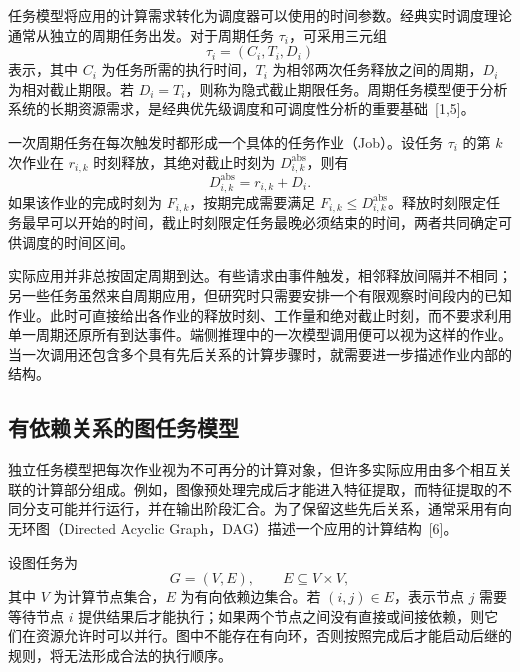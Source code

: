 任务模型将应用的计算需求转化为调度器可以使用的时间参数。经典实时调度理论通常从独立的周期任务出发。对于周期任务 $\tau_i$，可采用三元组
\begin{equation}\label{eq:ch2-periodic}
  \tau_i=(C_i,T_i,D_i)
\end{equation}
表示，其中 $C_i$ 为任务所需的执行时间，$T_i$ 为相邻两次任务释放之间的周期，$D_i$ 为相对截止期限。若 $D_i=T_i$，则称为隐式截止期限任务。周期任务模型便于分析系统的长期资源需求，是经典优先级调度和可调度性分析的重要基础~[1,5]。

一次周期任务在每次触发时都形成一个具体的任务作业（Job）。设任务 $\tau_i$ 的第 $k$ 次作业在 $r_{i,k}$ 时刻释放，其绝对截止时刻为 $D_{i,k}^{\mathrm{abs}}$，则有
\begin{equation}\label{eq:ch2-jobdeadline}
  D_{i,k}^{\mathrm{abs}}=r_{i,k}+D_i.
\end{equation}
如果该作业的完成时刻为 $F_{i,k}$，按期完成需要满足 $F_{i,k}\leq D_{i,k}^{\mathrm{abs}}$。释放时刻限定任务最早可以开始的时间，截止时刻限定任务最晚必须结束的时间，两者共同确定可供调度的时间区间。

实际应用并非总按固定周期到达。有些请求由事件触发，相邻释放间隔并不相同；另一些任务虽然来自周期应用，但研究时只需要安排一个有限观察时间段内的已知作业。此时可直接给出各作业的释放时刻、工作量和绝对截止时刻，而不要求利用单一周期还原所有到达事件。端侧推理中的一次模型调用便可以视为这样的作业。当一次调用还包含多个具有先后关系的计算步骤时，就需要进一步描述作业内部的结构。

\subsection{有依赖关系的图任务模型}

独立任务模型把每次作业视为不可再分的计算对象，但许多实际应用由多个相互关联的计算部分组成。例如，图像预处理完成后才能进入特征提取，而特征提取的不同分支可能并行运行，并在输出阶段汇合。为了保留这些先后关系，通常采用有向无环图（Directed Acyclic Graph，DAG）描述一个应用的计算结构~[6]。

设图任务为
\begin{equation}\label{eq:ch2-dag}
  G=(V,E),\qquad E\subseteq V\times V,
\end{equation}
其中 $V$ 为计算节点集合，$E$ 为有向依赖边集合。若 $(i,j)\in E$，表示节点 $j$ 需要等待节点 $i$ 提供结果后才能执行；如果两个节点之间没有直接或间接依赖，则它们在资源允许时可以并行。图中不能存在有向环，否则按照完成后才能启动后继的规则，将无法形成合法的执行顺序。

